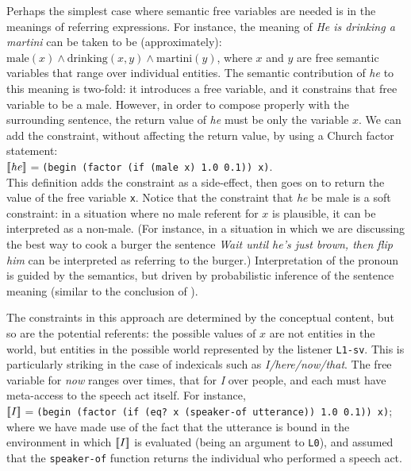 \documentclass[12pt]{article}
\newcommand{\llbracket}{\ensuremath{\left [\!\left [}}%
\newcommand{\rrbracket}{\ensuremath{\right ]\!\right ]}}
\providecommand{\sv}[1]{\ensuremath{\llbracket #1 \rrbracket}}
\newcounter{definition}
\begin{document}
Perhaps the simplest case where semantic free variables are needed is in the meanings of referring expressions. 
For instance, the meaning of \emph{He is drinking a martini} can be taken to be (approximately): $\text{male}(x)\wedge \text{drinking}(x,y) \wedge \text{martini}(y)$, where $x$ and $y$ are free semantic variables that range over individual entities. The semantic contribution of \emph{he} to this meaning is two-fold: it introduces a free variable, and it constrains that free variable to be a male. However, in order to compose properly with the surrounding sentence, the return value of \emph{he} must be only the variable $x$. We can add the constraint, without affecting the return value, by using a Church factor statement: \\
\indent \sv{\mathit{he}}$=$\lstinline[keepspaces]{(begin (factor (if (male x) 1.0 0.1)) x)}. \\
This definition adds the constraint as a side-effect, then goes on to return the value of the free variable \lstinline{x}.
Notice that the constraint that \emph{he} be male is a soft constraint: in a situation where no male referent for $x$ is plausible, it can be interpreted as a non-male. (For instance, in a situation in which we are discussing the best way to cook a burger the sentence \emph{Wait until he's just brown, then flip him} can be interpreted as referring to the burger.) Interpretation of the pronoun is guided by the semantics, but driven by probabilistic inference of the sentence meaning (similar to the conclusion of \citet{kehler08}).

The constraints in this approach are determined by the conceptual content, but so are the potential referents: the possible values of $x$ are not entities in the world, but entities in the possible world represented by the listener \lstinline{L1-sv}. This is particularly striking in the case of
indexicals such as \emph{I/here/now/that}. The free variable for \emph{now} ranges over times, that for \emph{I} over people, and each must have meta-access to the speech act itself. For instance, \\
\indent \sv{I}$=$\lstinline[keepspaces]{(begin (factor (if (eq? x (speaker-of utterance)) 1.0 0.1)) x)}; \\
where we have made use of the fact that the utterance is bound in the environment in which \sv{I} is evaluated (being an argument to \lstinline{L0}), and assumed that the \lstinline{speaker-of} function returns the individual who performed a speech act.
\end{document}
